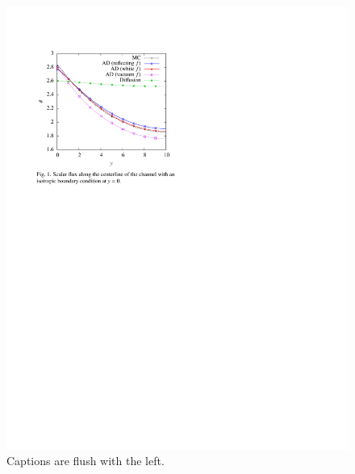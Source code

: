 \documentclass{anstrans}
\begin{document}
\begin{figure}[ht] %
  \centering
  \includegraphics{example_figure}
  \caption{Captions are flush with the left.}
  \label{fig:voltage}
\end{figure}
\end{document}
